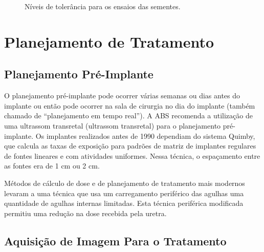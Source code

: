 \documentclass[11pt,a4paper]{article}
\begin{document}
	\begin{figure}[h]
		\centering
		\caption{Níveis de tolerância para os ensaios das sementes.}
		\label{fig:niveisAcaoAssay}
	\end{figure}

	
\section{Planejamento de Tratamento}

\subsection*{Planejamento Pré-Implante}

	O planejamento pré-implante pode ocorrer várias semanas ou dias antes do implante ou  então pode ocorrer na sala de cirurgia no dia do implante (também chamado de “planejamento em tempo real”). A ABS recomenda a utilização de uma ultrassom transretal (ultrassom transretal) para o planejamento pré-implante. Os implantes realizados antes de 1990 dependiam do sistema Quimby, que calcula as taxas de exposição para padrões de matriz de implantes regulares de fontes lineares e com atividades uniformes. Nessa técnica, o espaçamento entre as fontes era de 1 cm ou 2 cm. 

	Métodos de cálculo de dose e de planejamento de tratamento mais modernos levaram a uma técnica que usa um carregamento periférico das agulhas uma quantidade de agulhas internas limitadas. Esta técnica periférica modificada permitiu uma redução na dose recebida pela uretra.

\subsection*{Aquisição de Imagem Para o Tratamento}
\end{document}
